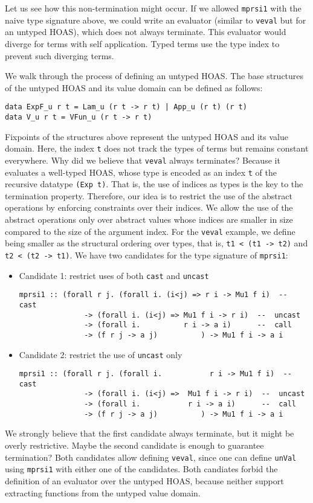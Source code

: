 \documentclass[a4paper,UKenglish]{lipics}
\begin{document}
Let us see how this non-termination might occur. If we allowed
\lstinline{mprsi1} with the naive type signature above, we could write
an evaluator (similar to \lstinline{veval} but for an untyped HOAS),
which does not always terminate. This evaluator would diverge for terms
with self application. Typed terms use the type index to prevent
such diverging terms.

We walk through the process of defining an untyped HOAS.
The base structures of the untyped HOAS and its value domain
can be defined as follows:
\begin{lstlisting}
data ExpF_u r t = Lam_u (r t -> r t) | App_u (r t) (r t)
data V_u r t = VFun_u (r t -> r t)
\end{lstlisting}
Fixpoints of the structures above represent the untyped HOAS and
its value domain. Here, the index \lstinline{t} does not track
the types of terms but remains constant everywhere.
Why did we believe that \lstinline{veval} always terminates?
Because it evaluates a well-typed HOAS, whose type is encoded as
an index \lstinline{t} of the recursive datatype \lstinline{(Exp t)}. That is,
the use of indices as types is the key to the termination property.
Therefore, our idea is to restrict the use of the abstract operations
by enforcing constraints over their indices. We allow the use
of the abstract operations only over abstract values whose indices are
smaller in size compared to the size of the argument index.
For the \lstinline{veval} example, we define being smaller as
the structural ordering over types, that is, \lstinline{t1 < (t1 -> t2)}
and \lstinline{t2 < (t2 -> t1)}.
We have two candidates for the type signature of \lstinline{mprsi1}:
\begin{itemize}
\item Candidate 1: restrict uses of both \lstinline{cast} and \lstinline{uncast}
\begin{lstlisting}
mprsi1 :: (forall r j. (forall i. (i<j) => r i -> Mu1 f i)  --  cast
               -> (forall i. (i<j) => Mu1 f i -> r i)  --  uncast
               -> (forall i.          r i -> a i)      --  call
               -> (f r j -> a j)          ) -> Mu1 f i -> a i
\end{lstlisting}
\item Candidate 2: restrict the use of \lstinline{uncast} only
\begin{lstlisting}
mprsi1 :: (forall r j. (forall i.           r i -> Mu1 f i)  --  cast
               -> (forall i. (i<j) =>  Mu1 f i -> r i)  --  uncast
               -> (forall i.           r i -> a i)      --  call
               -> (f r j -> a j)          ) -> Mu1 f i -> a i
\end{lstlisting}
\end{itemize}
We strongly believe that the first candidate always terminate,
but it might be overly restrictive. Maybe the second candidate is
enough to guarantee termination? Both candidates allow defining
\lstinline{veval}, since one can define \lstinline{unVal}
using \lstinline{mprsi1} with either one of the candidates.
Both candiates forbid the definition of an evaluator over the untyped HOAS,
because neither support extracting functions from the untyped value domain.
\end{document}
